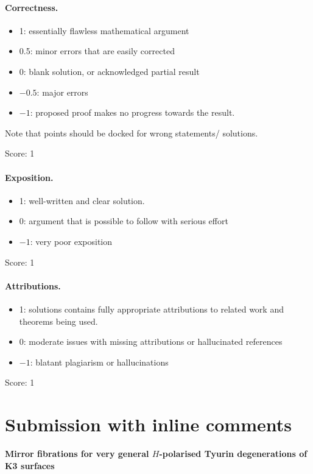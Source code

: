 \documentclass[11pt]{article}
\theoremstyle{definition}
\theoremstyle{remark}
\begin{document}
\paragraph{Correctness.}
\begin{itemize}
	\item  1: essentially flawless mathematical argument
	\item  0.5: minor errors that are easily corrected
	\item  0: blank solution, or acknowledged partial result
	\item  $-0.5$: major errors
	\item  $-1$: proposed proof makes no progress towards the result.
\end{itemize}
Note that points should be docked for wrong statements/ solutions.

\noindent Score: 1

\paragraph{Exposition.}
\begin{itemize}
	\item  1: well-written and clear solution.
	\item  0: argument that is possible to follow with serious effort
	\item  $-1$: very poor exposition
\end{itemize}

\noindent Score: 1

\paragraph{Attributions.}
\begin{itemize}
	\item  1: solutions contains fully appropriate attributions
		to related work and theorems being used.
	\item  0: moderate issues with missing attributions or hallucinated references
	\item  $-1$: blatant plagiarism or hallucinations
\end{itemize}

\noindent Score: 1

\newpage
\section{Submission with inline comments}


\begin{center}
\textbf{Mirror fibrations for very general \(H\)-polarised Tyurin
degenerations of K3 surfaces}
\end{center}
\end{document}
